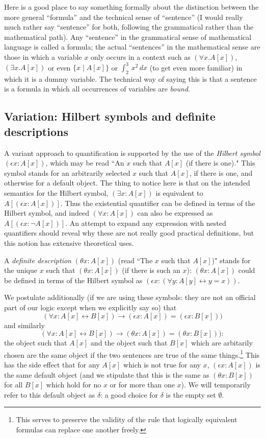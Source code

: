 \documentclass[12pt]{book}
\begin{document}
Here is a good place to say something formally about the distinction
between the more general ``formula'' and the technical sense of
``sentence'' (I would really much rather say ``sentence'' for both,
following the grammatical rather than the mathematical path).  Any
``sentence'' in the grammatical sense of mathematical language is
called a formula; the actual ``sentences'' in the mathematical sense
are those in which a variable $x$ only occurs in a context such as
$(\forall x.A[x])$, $(\exists x.A[x])$ or even $\{x \mid A[x]\}$ or
$\int_2^3 \,x^2\,dx$ (to get even more familiar) in which it is a
dummy variable.  The technical way of saying this is that a sentence
is a formula in which all occurrences of variables are {\em
bound\/}.

\subsection{Variation:  Hilbert symbols and definite descriptions}

A variant approach to quantification is supported by the use of the {\em Hilbert symbol\/} $(\epsilon x:A[x])$, which may be read ``An $x$ such that $A[x]$ (if there is one)."
This symbol stands for an arbitrarily selected $x$ such that $A[x]$, if there is one, and otherwise for a default object.  The thing to notice here is
that on the intended semantics for the Hilbert symbol, $(\exists x:A[x])$ is equivalent to $A[(\epsilon x:A[x])]$.  Thus the existential quantifier can be defined in terms of the Hilbert symbol, and indeed $(\forall x:A[x])$ can also be expressed as $A[(\epsilon x:\neg A[x])]$.  An attempt to expand any expression with nested quantifiers should reveal why these are not really good practical definitions, but this notion has extensive theoretical uses.

A {\em definite description\/} $(\theta x:A[x])$ (read ``The $x$ such that $A[x]$)" stands for the unique $x$ such that $(\theta x:A[x])$ (if there is such an $x$):  $(\theta x:A[x])$ could be defined in terms of the Hilbert symbol as $(\epsilon x:(\forall y:A[y] \leftrightarrow y=x))$.

We postulate additionally  (if we are using these symbols:  they are not an official part of our logic except when we explicitly say so)  that $$(\forall x:A[x] \leftrightarrow B[x]) \rightarrow (\epsilon x:A[x]) = (\epsilon x:B[x]))$$ and similarly  $$(\forall x:A[x] \leftrightarrow B[x]) \rightarrow (\theta x:A[x]) = (\theta x:B[x])):$$  the object such that $A[x]$ and the object such that $B[x]$ which are arbitarily chosen are the same object if the two sentences are true of the same things.\footnote{This serves to preserve the validity of the rule that logically equivalent formulas can replace one another freely.}  This has the side effect that for any $A[x]$ which is not true for any $x$, \newline $(\epsilon x:A[x])$ is the same default object (and we stipulate that this is the same as $(\theta x:B[x])$ for all $B[x]$ which hold for no $x$ or for more than one $x$).  We will temporarily refer to this default object as $\delta$:  a good choice for $\delta$ is the empty set $\emptyset$.
\end{document}
